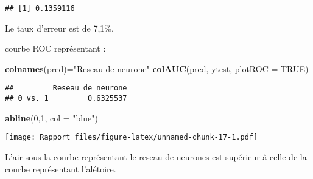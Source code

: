 \documentclass[
]{article}
\newenvironment{Shaded}{\begin{snugshade}}{\end{snugshade}}
\newcommand{\DataTypeTok}[1]{\textcolor[rgb]{0.13,0.29,0.53}{#1}}
\newcommand{\DecValTok}[1]{\textcolor[rgb]{0.00,0.00,0.81}{#1}}
\newcommand{\KeywordTok}[1]{\textcolor[rgb]{0.13,0.29,0.53}{\textbf{#1}}}
\newcommand{\NormalTok}[1]{#1}
\newcommand{\OtherTok}[1]{\textcolor[rgb]{0.56,0.35,0.01}{#1}}
\newcommand{\StringTok}[1]{\textcolor[rgb]{0.31,0.60,0.02}{#1}}
\begin{document}
\begin{verbatim}
## [1] 0.1359116
\end{verbatim}

Le taux d'erreur est de 7,1\%.

courbe ROC représentant :

\begin{Shaded}
\begin{Highlighting}[]
\KeywordTok{colnames}\NormalTok{(pred)=}\StringTok{"Reseau de neurone"}
\KeywordTok{colAUC}\NormalTok{(pred, ytest, }\DataTypeTok{plotROC =} \OtherTok{TRUE}\NormalTok{)}
\end{Highlighting}
\end{Shaded}

\begin{verbatim}
##         Reseau de neurone
## 0 vs. 1         0.6325537
\end{verbatim}

\begin{Shaded}
\begin{Highlighting}[]
\KeywordTok{abline}\NormalTok{(}\DecValTok{0}\NormalTok{,}\DecValTok{1}\NormalTok{, }\DataTypeTok{col =} \StringTok{"blue"}\NormalTok{)}
\end{Highlighting}
\end{Shaded}

\texttt{[image: Rapport\_files/figure-latex/unnamed-chunk-17-1.pdf]}

L'air sous la courbe représentant le reseau de neurones est supérieur à
celle de la courbe représentant l'alétoire.
\end{document}
